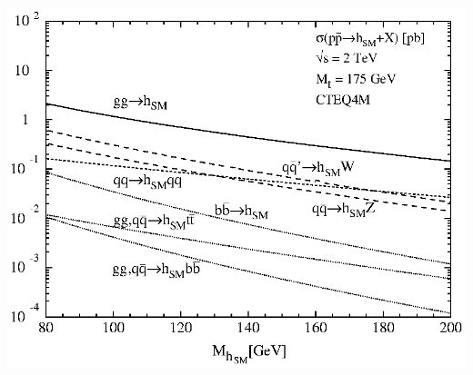 \begin{slide*}
\begin{center}
  \includegraphics[width=0.9\linewidth]{higgs_production.eps}
\end{center}

\end{slide*}


